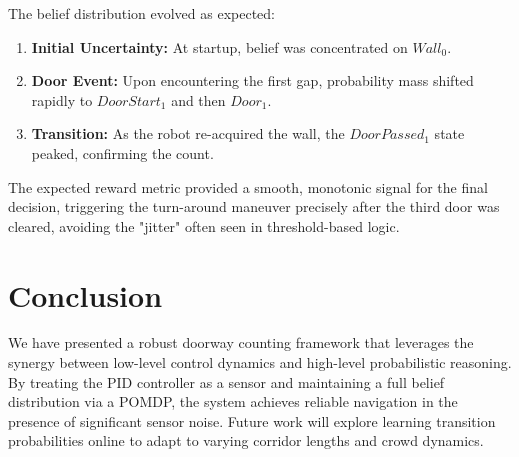 \documentclass[10pt, twocolumn]{article}
\begin{document}
The belief distribution evolved as expected:
\begin{enumerate}
    \item \textbf{Initial Uncertainty:} At startup, belief was concentrated on \(Wall_0\).
    \item \textbf{Door Event:} Upon encountering the first gap, probability mass shifted rapidly to \(DoorStart_1\) and then \(Door_1\).
    \item \textbf{Transition:} As the robot re-acquired the wall, the \(DoorPassed_1\) state peaked, confirming the count.
\end{enumerate}
The expected reward metric provided a smooth, monotonic signal for the final decision, triggering the turn-around maneuver precisely after the third door was cleared, avoiding the "jitter" often seen in threshold-based logic.

\section{Conclusion}
We have presented a robust doorway counting framework that leverages the synergy between low-level control dynamics and high-level probabilistic reasoning. By treating the PID controller as a sensor and maintaining a full belief distribution via a POMDP, the system achieves reliable navigation in the presence of significant sensor noise. Future work will explore learning transition probabilities online to adapt to varying corridor lengths and crowd dynamics.
\end{document}
